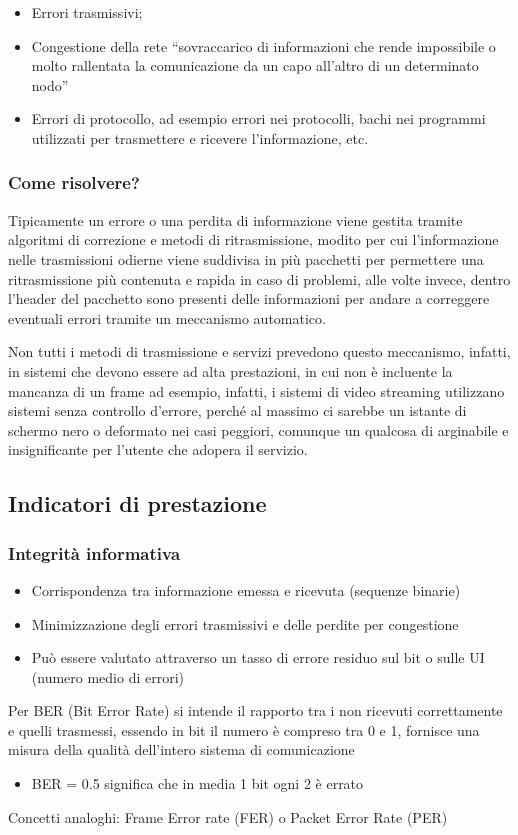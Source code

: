 \begin{itemize}
\item Errori trasmissivi;
\item Congestione della rete ``sovraccarico di informazioni che rende impossibile o molto rallentata la
  comunicazione da un capo all'altro di un determinato nodo''
\item Errori di protocollo, ad esempio errori nei protocolli, bachi nei programmi utilizzati per trasmettere
  e ricevere l'informazione, etc.
\end{itemize}

\subsubsection{Come risolvere?}
\label{sec:riserrtr}
Tipicamente un errore o una perdita di informazione viene gestita tramite algoritmi di correzione e metodi di
ritrasmissione, modito per cui l'informazione nelle trasmissioni odierne viene suddivisa in più pacchetti per
permettere una ritrasmissione più contenuta e rapida in caso di problemi, alle volte invece, dentro l'header
del pacchetto sono presenti delle informazioni per andare a correggere eventuali errori tramite un meccanismo
automatico.
\begin{oss}
  Non tutti i metodi di trasmissione e  servizi prevedono questo meccanismo, infatti, in sistemi che devono essere
  ad alta prestazioni, in cui non è incluente la mancanza di un frame ad esempio, infatti, i sistemi
  di video streaming utilizzano sistemi senza controllo d'errore, perché al massimo ci sarebbe un istante
  di schermo nero o deformato nei casi peggiori, comunque un qualcosa di arginabile e insignificante per
  l'utente che adopera il servizio.
\end{oss}

\subsection{Indicatori di prestazione}
\label{sec:indprest}

\subsubsection{Integrità informativa}
\label{sec:intinfo}
\begin{itemize}
\item Corrispondenza tra informazione emessa e ricevuta (sequenze binarie)
\item Minimizzazione degli errori trasmissivi e delle perdite per congestione
\item Può essere valutato attraverso un tasso di errore residuo sul bit o sulle UI (numero medio di errori)
\end{itemize}
Per BER (Bit Error Rate) si intende il rapporto tra i non ricevuti correttamente e quelli trasmessi, essendo
in bit il numero è compreso tra 0 e 1, fornisce una misura della qualità dell'intero sistema di comunicazione
\begin{itemize}
\item BER = 0.5 significa che in media 1 bit ogni 2 è errato
\end{itemize}
Concetti analoghi: Frame Error rate (FER) o Packet Error Rate (PER)

